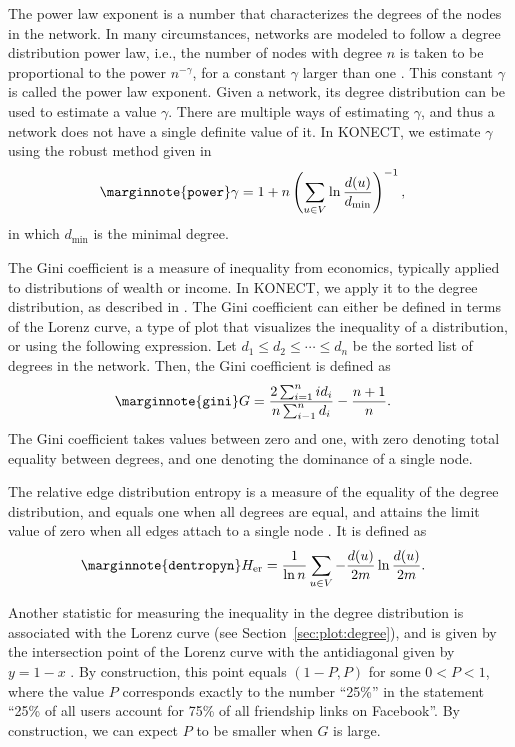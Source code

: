 \documentclass{article}
\begin{document}
The power law exponent is a number that characterizes the degrees of the
nodes in the network.  In many circumstances, networks are modeled to
follow a degree distribution power law, i.e., the number of nodes with
degree $n$ is taken to be proportional to the power $n^{-\gamma}$, for a
constant $\gamma$ larger than one \citep{b439}.  This constant $\gamma$
is called the power law exponent.  Given a network, its degree
distribution can be used to estimate a value $\gamma$.  There are
multiple ways of estimating $\gamma$, and thus a network does not have a
single definite value of it. In KONECT, we estimate $\gamma$ using the
robust method given in \citep[Eq.~5]{b408}
\begin{align}
  \marginnote{\texttt{power}} \gamma &= 1 + n \left( \sum_{u\in V} \ln
  \frac {d(u)} {d_{\min}} \right) ^{-1},
\end{align}
in which $d_{\min}$ is the minimal degree.

The Gini coefficient is a measure of inequality from economics,
typically applied to distributions of wealth or income.  In KONECT, we
apply it to the degree distribution, as described in
\citep{kunegis:power-law}.  The Gini coefficient can either be defined in
terms of the Lorenz curve, a type of plot that visualizes the inequality
of a distribution, or using the following expression.  Let $d_1 \leq d_2
\leq \dotsb \leq d_{n}$ be the sorted list of degrees in the
network. Then, the Gini coefficient is defined as
\begin{align}
  \marginnote{\texttt{gini}} G &= \frac {2 \sum_{i=1}^{n} i d_i} {n
    \sum_{i-1}^{n} d_i} - \frac {n+1} {n}.
\end{align}
The Gini coefficient takes values between zero and one, with zero
denoting total equality between degrees, and one denoting the dominance
of a single node.

The relative edge distribution entropy is a measure of the equality of
the degree distribution, and equals one when all degrees are equal, and
attains the limit value of zero when all edges attach to a single node
\citep{kunegis:power-law}.  It is defined as
\begin{align}
  \marginnote{\texttt{dentropyn}} H_{\mathrm{er}} &= \frac 1 {\ln n}
  \sum_{u \in V} - \frac{d(u)}{2m} \ln \frac{d(u)}{2m}.
\end{align}

Another statistic for  measuring the inequality
in the degree distribution is associated with the Lorenz curve (see
Section~\ref{sec:plot:degree}), and is given by the intersection point
of the Lorenz curve with the antidiagonal given by $y = 1 - x$
\citep{kunegis:power-law}.  By construction, this point equals $(1-P, P)$
for some $0<P<1$, where the value $P$ corresponds exactly to the number
``25\%'' in the statement ``25\% of all users account for 75\% of all
friendship links on Facebook''.  By construction, we can expect $P$ to
be smaller when $G$ is large.
\end{document}
